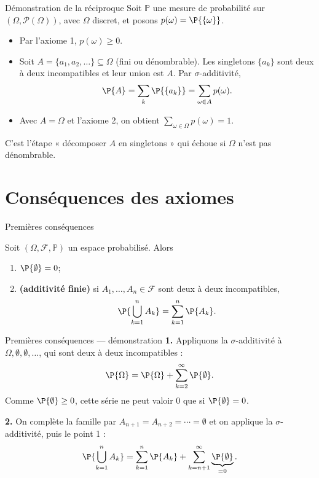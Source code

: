 \documentclass[nuit,charter,pied]{BeamerJS}
\newcommand{\tribu}{\mathcal{F}}
\begin{document}
\begin{frame}[t]{Démonstration de la réciproque}
\pause
	Soit \(\mathbb{P}\) une mesure de probabilité sur \((\Omega,\mathcal{P}(\Omega))\), avec \(\Omega\) discret, et posons \(p(\omega)=\P{\{\omega\}}\).
	\pause
	\begin{itemize}
		\item Par l'axiome 1, \(p(\omega)\geq 0\).\pause
		\item Soit \(A=\{a_1,a_2,\ldots\}\subseteq\Omega\) (fini ou dénombrable). Les singletons \(\{a_k\}\) sont deux à deux incompatibles et leur union est \(A\). \pause Par \(\sigma\)-additivité,
		\[\P{A}=\sum_{k}\P{\{a_k\}}=\sum_{\omega\in A}p(\omega).\]\pause
		\item Avec \(A=\Omega\) et l'axiome 2, on obtient \(\sum_{\omega\in\Omega}p(\omega)=1\).
	\end{itemize}
	\pause
	\begin{lumiere}
		C'est l'étape « décomposer \(A\) en singletons » qui échoue si \(\Omega\) n'est pas dénombrable.
	\end{lumiere}
\end{frame}

\section{Conséquences des axiomes}

\begin{frame}[t]{Premières conséquences}
\pause
	\begin{prop}
		Soit \((\Omega,\tribu,\mathbb{P})\) un espace probabilisé. Alors
		\begin{enumerate}
			\item \(\P{\emptyset}=0\);\pause
			\item \textbf{(additivité finie)} si \(A_1,\ldots,A_n\in\tribu\) sont deux à deux incompatibles,
			\[\P{\bigcup_{k=1}^{n}A_k}=\sum_{k=1}^{n}\P{A_k}.\]
		\end{enumerate}
	\end{prop}
	\pause
\end{frame}

\begin{frame}[t]{Premières conséquences --- démonstration}
	\textbf{1.} Appliquons la \(\sigma\)-additivité à \(\Omega,\emptyset,\emptyset,\ldots\), qui sont deux à deux incompatibles :
	\[\P{\Omega}=\P{\Omega}+\sum_{k=2}^{\infty}\P{\emptyset}.\]
	\pause Comme \(\P{\emptyset}\geq 0\), cette série ne peut valoir \(0\) que si \(\P{\emptyset}=0\).
	\pause
	\medskip

	\textbf{2.} On complète la famille par \(A_{n+1}=A_{n+2}=\cdots=\emptyset\) et on applique la \(\sigma\)-additivité, puis le point 1 :
	\[\P{\bigcup_{k=1}^{n}A_k}=\sum_{k=1}^{n}\P{A_k}+\sum_{k=n+1}^{\infty}\underbrace{\P{\emptyset}}_{=0}.\]
\end{frame}
\end{document}
